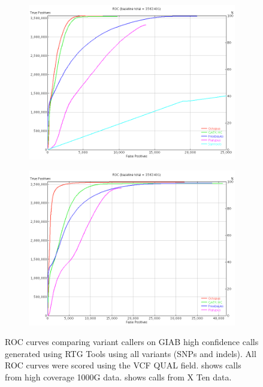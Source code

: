 \documentclass[notitlepage, twocolumn]{article}
\begin{document}
\begin{figure}[ht]
    \centering
    \begin{subfigure}[b]{0.49\textwidth}
        \includegraphics[width=\textwidth]{figures/giab_1000g}
        \caption{}
        \label{fig:1000g}
    \end{subfigure}
    \hfill
    \begin{subfigure}[b]{0.49\textwidth}
        \includegraphics[width=\textwidth]{figures/giab_x10}
        \caption{}
        \label{fig:x10}
    \end{subfigure}
    \caption{ROC curves comparing variant callers on GIAB high confidence calls generated using RTG Tools using all variants (SNPs and indels). All ROC curves were scored using the VCF QUAL field. \protect{} shows calls from high coverage 1000G data. \protect{} shows calls from X Ten data.}
    \label{fig:giab}
\end{figure}
\end{document}
